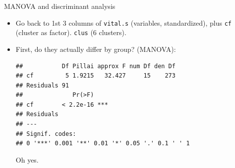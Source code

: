 \begin{frame}[fragile]{MANOVA and discriminant analysis}
  
  \begin{itemize}
  \item Go back to 1st 3 columns of \texttt{vital.s} (variables,
    standardized), plus \texttt{cf} (cluster as factor).
    \texttt{clus} (6 clusters).
  \item First, do they actually differ by group? (MANOVA):
    {\small
\begin{knitrout}
\color{fgcolor}\begin{kframe}
\begin{alltt}
\hlkwb{=}\hlstd{(vital.s[,}\hlopt{:}\hlstd{])}
\hlkwb{=}\hlopt{$}
\hlkwb{=}\hlopt{~}
\end{alltt}
\begin{verbatim}
##           Df Pillai approx F num Df den Df
## cf         5 1.9215   32.427     15    273
## Residuals 91                              
##              Pr(>F)    
## cf        < 2.2e-16 ***
## Residuals              
## ---
## Signif. codes:  
## 0 '***' 0.001 '**' 0.01 '*' 0.05 '.' 0.1 ' ' 1
\end{verbatim}
\end{kframe}
\end{knitrout}
}

Oh yes.
    
  \end{itemize}
  
\end{frame}

